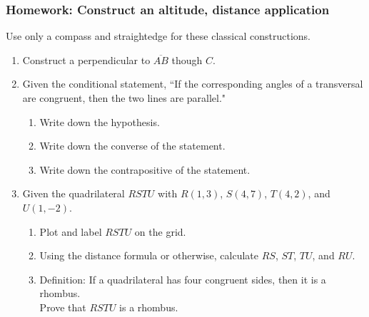 \documentclass[12pt, oneside]{article}
\begin{document}
\subsubsection*{Homework: Construct an altitude, distance application}
Use only a compass and straightedge for these classical constructions.
  \begin{enumerate}

  \item Construct a perpendicular to $\overline{AB}$ though $C$.\\
    \vspace{2cm}
    \begin{center}
  \end{center} \vspace{5cm}

  \item Given the conditional statement, ``If the corresponding angles of a transversal are congruent, then the two lines are parallel."
    \begin{enumerate}
      \item Write down the hypothesis. \vspace{1.5cm}
      \item Write down the converse of the statement. \vspace{2cm}
      \item Write down the contrapositive of the statement. \vspace{1.5cm}
    \end{enumerate}

\newpage
\item Given the quadrilateral $RSTU$ with $R(1,3)$, $S(4,7)$, $T(4,2)$, and $U(1,-2)$.
\begin{enumerate}
  \item Plot and label $RSTU$ on the grid.
  \item Using the distance formula or otherwise, calculate $RS$, $ST$, $TU$, and $RU$.
  \item Definition: If a quadrilateral has four congruent sides, then it is a rhombus.\\[0.5cm]
  Prove that $RSTU$ is a rhombus.
\end{enumerate}

\begin{center} %
\end{center}


\end{enumerate}
\end{document}
